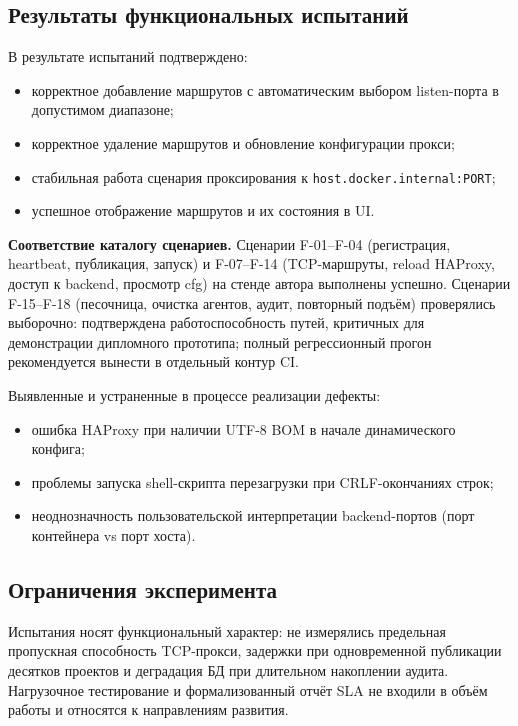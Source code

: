 \subsection{Результаты функциональных испытаний}

В результате испытаний подтверждено:
\begin{itemize}[leftmargin=1.5cm]
  \item корректное добавление маршрутов с автоматическим выбором listen-порта в допустимом диапазоне;
  \item корректное удаление маршрутов и обновление конфигурации прокси;
  \item стабильная работа сценария проксирования к \texttt{host.docker.internal:PORT};
  \item успешное отображение маршрутов и их состояния в UI.
\end{itemize}

\textbf{Соответствие каталогу сценариев.} Сценарии F-01--F-04 (регистрация, heartbeat, публикация, запуск) и F-07--F-14 (TCP-маршруты, reload HAProxy, доступ к backend, просмотр cfg) на стенде автора выполнены успешно. Сценарии F-15--F-18 (песочница, очистка агентов, аудит, повторный подъём) проверялись выборочно: подтверждена работоспособность путей, критичных для демонстрации дипломного прототипа; полный регрессионный прогон рекомендуется вынести в отдельный контур CI.

Выявленные и устраненные в процессе реализации дефекты:
\begin{itemize}[leftmargin=1.5cm]
  \item ошибка HAProxy при наличии UTF-8 BOM в начале динамического конфига;
  \item проблемы запуска shell-скрипта перезагрузки при CRLF-окончаниях строк;
  \item неоднозначность пользовательской интерпретации backend-портов (порт контейнера vs порт хоста).
\end{itemize}

\subsection{Ограничения эксперимента}

Испытания носят функциональный характер: не измерялись предельная пропускная способность TCP-прокси, задержки при одновременной публикации десятков проектов и деградация БД при длительном накоплении аудита. Нагрузочное тестирование и формализованный отчёт SLA не входили в объём работы и относятся к направлениям развития.

